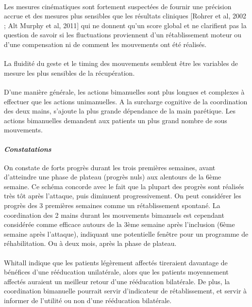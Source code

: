 \paragraph{}
Les mesures cinématiques sont fortement suspectées de fournir une précision accrue et des mesures plus sensibles que les résultats cliniques [Rohrer et al, 2002 ; Alt Murphy et al, 2011] qui ne donnent qu'un score global et ne clarifient pas la question de savoir si les fluctuations proviennent d'un rétablissement moteur ou d'une compensation ni de comment les mouvements ont été réalisés. 

\paragraph{}
La fluidité du geste et le timing des mouvements semblent être les variables de mesure les plus
sensibles de la récupération.

\paragraph{}
D'une manière générale, les actions bimanuelles sont plus longues et complexes à effectuer que les actions unimanuelles. A la surcharge cognitive de la coordination des deux mains, s'ajoute la plus grande dépendance de la main parétique. Les actions bimanuelles demandent aux patients un plus grand nombre de sous mouvements. 

		\paragraph{\emph{Constatations}\\}
On constate de forts progrès durant les trois premières semaines, avant d'atteindre une phase de plateau (progrès nuls) aux alentours de la 6ème semaine. Ce schéma concorde avec le fait que la plupart des progrès sont réalisés très tôt après l'attaque, puis diminuent progressivement. On peut considérer les progrès des 3 premières semaines comme un rétablissement spontané. La coordination des 2 mains durant les mouvements bimanuels est cependant considérée comme efficace autours de la 3ème semaine après l'inclusion (6ème semaine après l'attaque), indiquant une potentielle fenêtre pour un programme de réhabilitation. Ou à deux mois, après la phase de plateau.		

\paragraph{}
Whitall \cite{Whit04} indique que les patients légèrement affectés tireraient davantage de bénéfices d'une rééducation unilatérale, alors que les patients moyennement affectés auraient un meilleur retour d'une rééducation bilatérale. De plus, la coordination bimanuelle pourrait servir d'indicateur de rétablissement, et servir à informer de l'utilité ou non d'une rééducation bilatérale.

